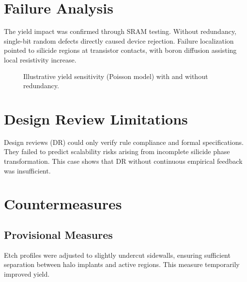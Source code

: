 \documentclass[conference]{IEEEtran}
\begin{document}
\section{Failure Analysis}
The yield impact was confirmed through SRAM testing. 
Without redundancy, single-bit random defects directly caused device rejection. 
Failure localization pointed to silicide regions at transistor contacts, with boron diffusion assisting local resistivity increase.

\begin{figure}[!t]
  \centering
  \caption{Illustrative yield sensitivity (Poisson model) with and without redundancy.}
  \label{fig:yield}
\end{figure}

\section{Design Review Limitations}
Design reviews (DR) could only verify rule compliance and formal specifications. 
They failed to predict scalability risks arising from incomplete silicide phase transformation. 
This case shows that DR without continuous empirical feedback was insufficient.

\section{Countermeasures}
\subsection{Provisional Measures}
Etch profiles were adjusted to slightly undercut sidewalls, ensuring sufficient separation between halo implants and active regions. 
This measure temporarily improved yield.
\end{document}
